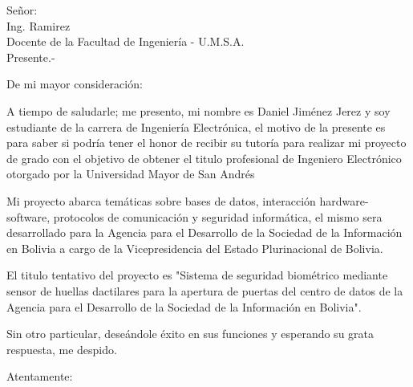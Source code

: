 \documentclass[12pt, letterpaper]{letter}
\begin{document}
	\begin{letter}{Señor:\\Ing. Ramirez\\Docente de la Facultad de Ingeniería - U.M.S.A.\\Presente.-}		
		\opening{ \vspace{2em}
		De mi mayor consideración:}
		A tiempo de saludarle; me presento, mi nombre es Daniel Jiménez Jerez y soy estudiante de la carrera de Ingeniería Electrónica, el motivo de la presente es para saber si podría tener el honor de recibir su tutoría para realizar mi proyecto de grado con el objetivo de obtener el titulo profesional de Ingeniero Electrónico otorgado por la Universidad Mayor de San Andrés
		
		Mi proyecto abarca temáticas sobre bases de datos, interacción hardware-software,  protocolos de comunicación y seguridad informática, el mismo sera desarrollado para la Agencia para el Desarrollo de la Sociedad de la Información en Bolivia a cargo de la Vicepresidencia del Estado Plurinacional de Bolivia.
		
		El titulo tentativo del proyecto es "Sistema de seguridad biométrico mediante sensor de huellas dactilares para la apertura de puertas del centro de datos de la Agencia para el Desarrollo de la Sociedad de la Información en Bolivia".
		
		Sin otro particular, deseándole éxito en sus funciones y esperando su grata respuesta, me despido.
		
		\closing{\hspace{-0cm}Atentamente:}
	\end{letter}
\end{document}
